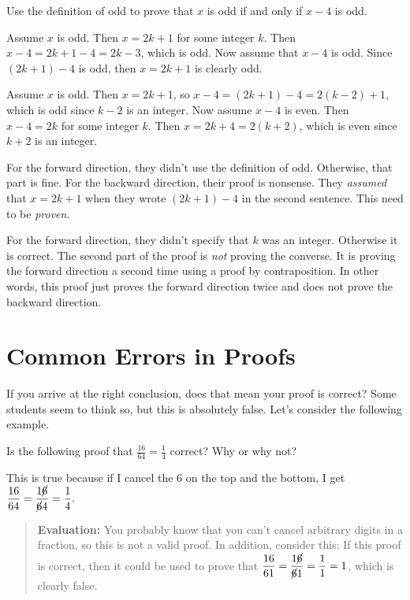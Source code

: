 \begin{eval}
Use the definition of odd to prove that $x$ is odd if and only if $x-4$ is odd.
\begin{spfenum}
\item
Assume $x$ is odd. Then $x=2k+1$ for some integer $k$.  Then
$x-4=2k+1-4=2k-3$, which is odd.
Now assume that $x-4$ is odd. Since $(2k+1)-4$ is odd, then $x=2k+1$ is clearly odd.\\
\evallinethree
\item
Assume $x$ is odd. Then $x=2k+1$, so $x-4=(2k+1)-4=2(k-2)+1$, which is odd since
$k-2$ is an integer.  
Now assume $x-4$ is even. Then $x-4=2k$ for some integer $k$.  
Then $x=2k+4=2(k+2)$, which is even since $k+2$ is an integer.\\
\evallinetwo
\end{spfenum}
\begin{answer}
\begin{pfevalenum}
\item
For the forward direction, they didn't use the definition of odd.  Otherwise, that part is fine.
For the backward direction, their proof is nonsense.  They {\em assumed} that $x=2k+1$ when they wrote
$(2k+1)-4$ in the second sentence.  This need to be {\em proven}.
\item
For the forward direction, they didn't specify that $k$ was an integer.  Otherwise it is correct.
The second part of the proof is {\em not} proving the converse.  It is proving the forward direction
a second time using a proof by contraposition.  In other words, this proof just proves the forward
direction twice and does not prove the backward direction.
\end{pfevalenum}
\end{answer}
\end{eval}

\newpage
\section{Common Errors in Proofs}\label{section:proofErrors}
If you arrive at the right conclusion, does that mean your proof is correct?  Some students seem to think
so, but this is absolutely false.  Let's consider the following example.
\begin{exa}
Is the following proof that $\displaystyle \frac{16}{64}=\frac{1}{4}$ correct?  Why or why not?
\begin{spf}
This is true because if I cancel the $6$ on the top and the bottom, I get
$\displaystyle \frac{16}{64}=\frac{1\cancel{6}}{\cancel{6}4}=\frac{1}{4}.$
\end{spf}
\begin{quote}
{\bf Evaluation:} You probably know that you can't cancel arbitrary digits in a fraction, so this
is not a valid proof.  In addition, consider this:  
If this proof is correct, then it could be used to prove that
$\displaystyle \frac{16}{61}=\frac{1\cancel{6}}{\cancel{6}1}=\frac{1}{1}=1$, which is clearly false.
\end{quote}
\end{exa}

